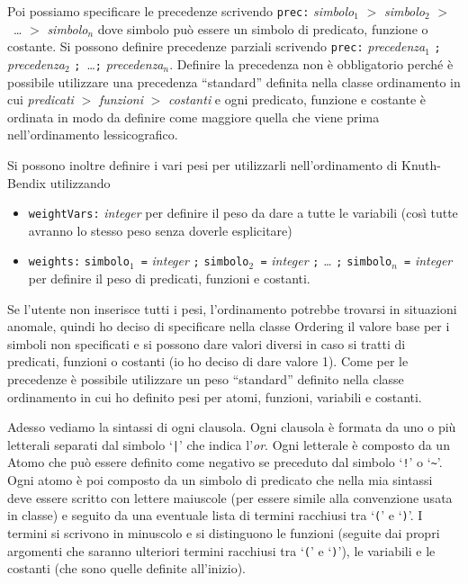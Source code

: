 \documentclass[a4paper,11pt]{article} %
\newcommand{\sintassi}{\texttt}
\newcommand{\classe}{\textsf}
\begin{document}
Poi possiamo specificare le precedenze scrivendo \sintassi{prec:} 
\emph{simbolo$_{1}$} \sintassi{$>$} \emph{simbolo$_{2}$} \sintassi{$>$}~\dots
\sintassi{$>$} \emph{simbolo$_{n}$}
dove simbolo può essere un simbolo di predicato, funzione o costante. Si possono
definire precedenze parziali scrivendo
\sintassi{prec:} \emph{precedenza$_{1}$} \sintassi{;} \emph{precedenza$_{2}$}
\sintassi{;}~\dots \sintassi{;} \emph{precedenza$_{n}$}. Definire la precedenza non
è obbligatorio perché è possibile utilizzare una precedenza ``standard'' definita
nella classe ordinamento in cui \emph{predicati} $>$ \emph{funzioni} $>$ \emph{costanti}
e ogni predicato, funzione e costante è ordinata in modo da definire come
maggiore quella che viene prima nell'ordinamento lessicografico.

Si possono inoltre definire i vari pesi per utilizzarli nell'ordinamento di 
Knuth-Bendix utilizzando
\begin{itemize}
  \item{\sintassi{weightVars:} \emph{integer}} per definire il peso da dare a tutte
le variabili (così tutte avranno lo stesso peso senza doverle esplicitare)
  \item{\sintassi{weights:} \sintassi{simbolo$_{1}$ =} \emph{integer} \sintassi{;} 
\sintassi{simbolo$_{2}$ =} \emph{integer} \sintassi{;} \emph{\ldots} \sintassi{;} 
\sintassi{simbolo$_{n}$ =} \emph{integer}} per definire il peso di predicati, 
funzioni e costanti.
\end{itemize}
Se l'utente non inserisce tutti i pesi, l'ordinamento potrebbe trovarsi in 
situazioni anomale, quindi ho deciso di specificare nella classe \classe{Ordering}
il valore base per i simboli non specificati e si possono dare valori diversi 
in caso si tratti di predicati, funzioni o costanti (io ho deciso di dare valore 1).
Come per le precedenze è possibile utilizzare un peso ``standard'' definito nella
classe ordinamento in cui %
ho definito pesi per atomi, funzioni, variabili e costanti.

Adesso vediamo la sintassi di ogni clausola.
Ogni clausola è formata da uno o più letterali separati dal simbolo `\sintassi{|}'
che indica l'\emph{or}. Ogni letterale è composto da un Atomo che può essere definito
come negativo se preceduto dal simbolo `\sintassi{!}' o `\sintassi{\~}'. Ogni atomo
è poi composto da un simbolo di predicato che nella mia sintassi 
deve essere scritto con lettere maiuscole
(per essere simile alla convenzione usata in classe) 
e seguito da una eventuale lista di termini racchiusi tra `\sintassi{(}' e `\sintassi{)}'.
I termini si scrivono in minuscolo e si distinguono le funzioni (seguite dai propri
argomenti che saranno ulteriori termini racchiusi tra `\sintassi{(}' e `\sintassi{)}'),
le variabili e le costanti (che sono quelle definite all'inizio).
\end{document}
